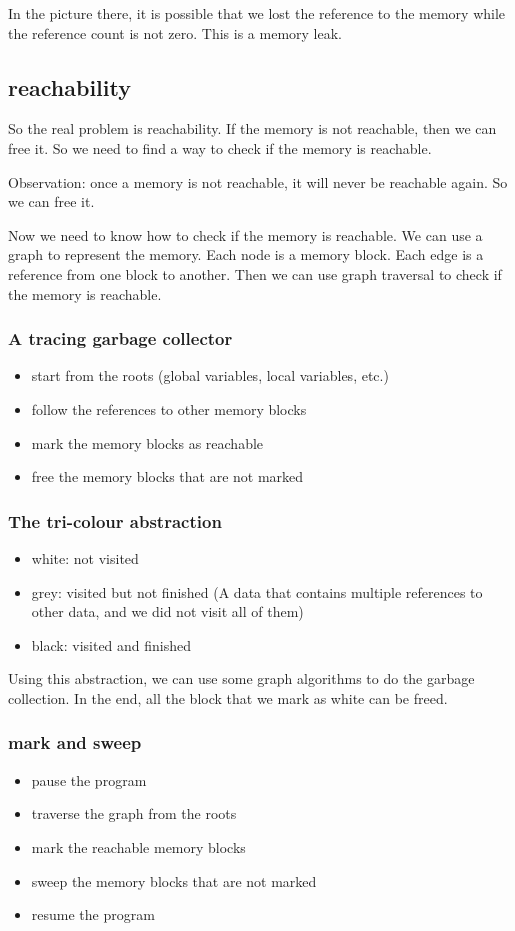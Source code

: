 \documentclass[letterpaper,12pt]{article}
\begin{document}
In the picture there, it is possible that we lost the reference to the memory
while the reference count is not zero. This is a memory leak.
\subsection{reachability}
So the real problem is reachability. If the memory is not reachable, then we
can free it. So we need to find a way to check if the memory is reachable.

Observation: once a memory is not reachable, it will never be reachable again.
So we can free it.

Now we need to know how to check if the memory is reachable. We can use a graph
to represent the memory. Each node is a memory block. Each edge is a reference
from one block to another. Then we can use graph traversal to check if the
memory is reachable.
\subsubsection{A tracing garbage collector}
\begin{itemize}
    \item start from the roots (global variables, local variables, etc.)
    \item follow the references to other memory blocks
    \item mark the memory blocks as reachable
    \item free the memory blocks that are not marked
\end{itemize}
\subsubsection{The tri-colour abstraction}
\begin{itemize}
    \item white: not visited
    \item grey: visited but not finished (A data that contains multiple references to
          other data, and we did not visit all of them)
    \item black: visited and finished
\end{itemize}
Using this abstraction, we can use some graph algorithms to do the garbage collection. In the end, all the block that we mark as white can be freed.
\subsubsection{mark and sweep}
\begin{itemize}
    \item pause the program
    \item traverse the graph from the roots
    \item mark the reachable memory blocks
    \item sweep the memory blocks that are not marked
    \item resume the program
\end{itemize}
\end{document}
